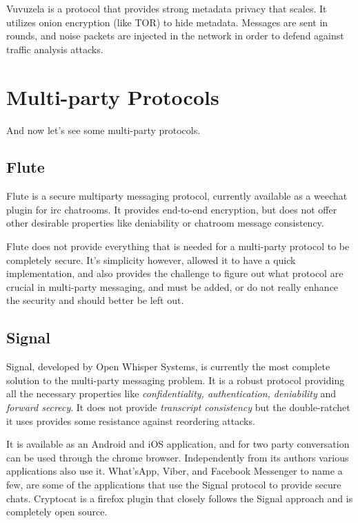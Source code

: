 Vuvuzela \cite{vuvuzela} is a protocol that provides strong metadata privacy that scales.
It utilizes onion encryption (like TOR) to hide metadata.
Messages are sent in rounds, and noise packets are injected in the network in order to defend against traffic analysis attacks.

\section{Multi-party Protocols}

And now let's see some multi-party protocols.

\subsection{Flute}

Flute is a secure multiparty messaging protocol, currently available as a weechat plugin for irc chatrooms.
It provides end-to-end encryption, but does not offer other desirable properties like deniability or chatroom message consistency.

Flute does not provide everything that is needed for a multi-party protocol to be completely secure.
It's simplicity however, allowed it to have a quick implementation, and also provides the challenge to figure out what protocol are crucial in multi-party messaging, and must be added, or do not really enhance the security and should better be left out.

\subsection{Signal}

Signal, developed by Open Whisper Systems, is currently the most complete solution to the multi-party messaging problem.
It is a robust protocol providing all the necessary properties like \emph{confidentiality, authentication, deniability} and \emph{forward secrecy}.
It does not provide \emph{transcript consistency} but the double-ratchet it uses provides some resistance against reordering attacks.

It is available as an Android and iOS application, and for two party conversation can be used through the chrome browser.
Independently from its authors various applications also use it.
What'sApp, Viber, and Facebook Messenger to name a few, are some of the applications that use the Signal protocol to provide secure chats.
Cryptocat is a firefox plugin that closely follows the Signal approach and is completely open source.
